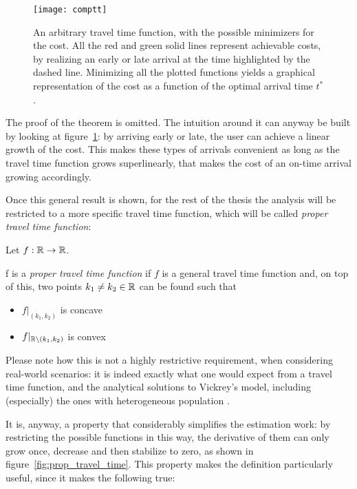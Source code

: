 \begin{figure}
  \centering
  \texttt{[image: comptt]}
  \caption{An arbitrary travel time function, with the possible minimizers for the cost.
    All the red and green solid lines represent achievable costs,
    by realizing an early or late arrival at the time highlighted by the dashed line.
  Minimizing all the plotted functions yields a graphical representation of the cost as a function of the optimal arrival time \(t^*\).}
  \label{fig:complex_tt}
\end{figure}

The proof of the theorem is omitted.
The intuition around it can anyway be built by looking at figure~\ref{fig:complex_tt}:
by arriving early or late, the user can achieve a linear growth of the cost.
This makes these types of arrivals convenient as long as the travel time function grows superlinearly,
that makes the cost of an on-time arrival growing accordingly.

Once this general result is shown, for the rest of the thesis the analysis will be restricted to a more specific travel time function,
which will be called \textit{proper travel time function}:
\begin{definition}
  \label{def:proper_tt}
  Let \(f:\mathbb{R}\rightarrow\mathbb{R}\).

  f is a \textit{proper travel time function} if \(f\) is a general travel time function and,
  on top of this, 
  two points \(k_1\neq k_2 \in \mathbb{R}\) can be found such that
  \begin{itemize}
  \item \(f|_{(k_1, k_2)}\) is concave
  \item \(f|_{\mathbb{R}\setminus(k_1, k_2)}\) is convex
  \end{itemize}
\end{definition}

Please note how this is not a highly restrictive requirement,
when considering real-world scenarios:
it is indeed exactly what one would expect from a travel time function,
and the analytical solutions to Vickrey's model,
including (especially) the ones with heterogeneous population \parencite{amirgholy2017analytical}.

It is, anyway, a property that considerably simplifies the estimation work:
by restricting the possible functions in this way,
the derivative of them can only grow once, decrease and then stabilize to zero,
as shown in figure~\ref{fig:prop_travel_time}.
This property makes the definition particularly useful, since it makes the following true:

